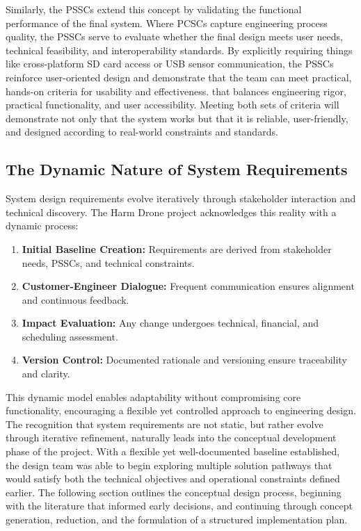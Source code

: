 \documentclass[12pt]{article}
\begin{document}
Similarly, the PSSCs extend this concept by validating the functional performance of the final system. Where PCSCs capture engineering process quality, the PSSCs serve to evaluate whether the final design meets user needs, technical feasibility, and interoperability standards. By explicitly requiring things like cross-platform SD card access or USB sensor communication, the PSSCs reinforce user-oriented design and demonstrate that the team can meet practical, hands-on criteria for usability and effectiveness.
 that balances engineering rigor, practical functionality, and user accessibility. Meeting both sets of criteria will demonstrate not only that the system works but that it is reliable, user-friendly, and designed according to real-world constraints and standards.

\subsection{The Dynamic Nature of System Requirements}

System design requirements evolve iteratively through stakeholder interaction and technical discovery. The Harm Drone project acknowledges this reality with a dynamic process:

\begin{enumerate}
    \item \textbf{Initial Baseline Creation:} Requirements are derived from stakeholder needs, PSSCs, and technical constraints.
    \item \textbf{Customer-Engineer Dialogue:} Frequent communication ensures alignment and continuous feedback.
    \item \textbf{Impact Evaluation:} Any change undergoes technical, financial, and scheduling assessment.
    \item \textbf{Version Control:} Documented rationale and versioning ensure traceability and clarity.
\end{enumerate}

This dynamic model enables adaptability without compromising core functionality, encouraging a flexible yet controlled approach to engineering design.
The recognition that system requirements are not static, but rather evolve through iterative refinement, naturally leads into the conceptual development phase of the project. With a flexible yet well-documented baseline established, the design team was able to begin exploring multiple solution pathways that would satisfy both the technical objectives and operational constraints defined earlier. The following section outlines the conceptual design process, beginning with the literature that informed early decisions, and continuing through concept generation, reduction, and the formulation of a structured implementation plan.
\end{document}

